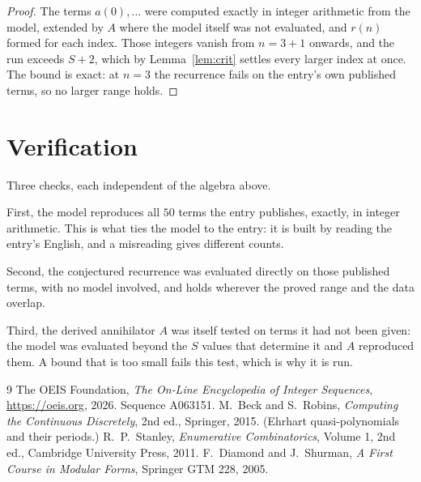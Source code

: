 \documentclass[11pt,a4paper]{article}
\theoremstyle{plain}
\theoremstyle{definition}
\begin{document}
\begin{proof}
The terms $a(0),\dots$ were computed exactly in integer arithmetic from the model, extended by
$A$ where the model itself was not evaluated, and $r(n)$ formed for each index. Those integers
vanish from $n=3+1$ onwards, and the run exceeds $S+2$, which by
Lemma~\ref{lem:crit} settles every larger index at once. The bound is exact: at $n=3$ the recurrence fails on the entry's own published terms, so no larger range holds.
\end{proof}

\section{Verification}

Three checks, each independent of the algebra above.

First, the model reproduces all $50$ terms the entry publishes, exactly, in integer
arithmetic. This is what ties the model to the entry: it is built by reading the entry's
English, and a misreading gives different counts.

Second, the conjectured recurrence was evaluated directly on those published terms, with no
model involved, and holds wherever the proved range and the data overlap.

Third, the derived annihilator $A$ was itself tested on terms it had not been given: the model
was evaluated beyond the $S$ values that determine it and $A$ reproduced them. A bound that is
too small fails this test, which is why it is run.

\begin{thebibliography}{9}
 The OEIS Foundation, \emph{The On-Line Encyclopedia of Integer
Sequences}, \url{https://oeis.org}, 2026. Sequence A063151.
 M.~Beck and S.~Robins, \emph{Computing the Continuous Discretely},
2nd ed., Springer, 2015. (Ehrhart quasi-polynomials and their periods.)
 R.~P.~Stanley, \emph{Enumerative Combinatorics}, Volume 1, 2nd ed.,
Cambridge University Press, 2011.
 F.~Diamond and J.~Shurman, \emph{A First Course in Modular Forms},
Springer GTM 228, 2005.
\end{thebibliography}
\end{document}
